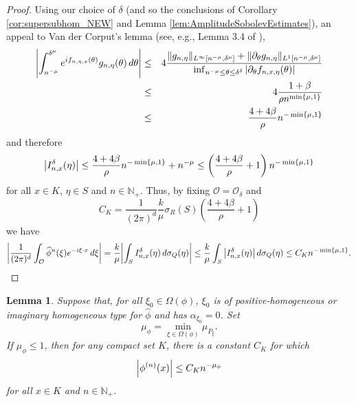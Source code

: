 \documentclass[11pt]{article}
\newtheorem{lemma}[theorem]{Lemma}
\newcommand{\f}[2]{\frac{#1}{#2}}
\begin{document}
\begin{proof}
Using our choice of $\delta$ (and so the conclusions of Corollary \ref{cor:supersubhom_NEW} and Lemma \ref{lem:AmplitudeSobolevEstimates}), an appeal to Van der Corput's lemma (see, e.g., Lemma 3.4 of \cite{Randles2015}),
\begin{eqnarray*}
    \abs{\int_{n^{-\mu}}^{\delta^\mu}e^{if_{n,\eta,x}(\theta)}g_{n,\eta}(\theta)\,d\theta}
    &\leq& 
    4
    \frac{ 
    \|g_{n,\eta}\|_{L^\infty[n^{-\mu},\delta^{\mu}]}
    +
    \|\partial_{\theta}g_{n,\eta}\|_{L^1[n^{-\mu},\delta^{\mu}]}
    }{
    \inf_{n^{-\mu}\leq\theta\leq \delta^{\delta}}|\partial_{\theta}f_{n,x,\eta}(\theta)|
    }\\
    &\leq&4\frac{1+\beta}{\rho n^{\min\{\mu,1\}}}\\
    &\leq &\frac{4+4\beta}{\rho}n^{-\min\{\mu,1\}}
\end{eqnarray*}
and therefore
\begin{equation*}
    \abs{I_{n,x}^\delta(\eta)}\leq \frac{4+4\beta}{\rho}n^{-\min\{\mu,1\}}+n^{-\mu}\leq \left(\frac{4+4\beta}{\rho}+1\right)n^{-\min\{\mu,1\}}
\end{equation*}
for all $x\in K$, $\eta\in S$ and $n\in\mathbb{N}_+$. Thus, by fixing $\mathcal{O}=\mathcal{O}_\delta$ and 
\begin{equation*}
    C_K=\f{1}{(2\pi)^d} \f{k}{\mu} \sigma_R(S)\left(\frac{4+4\beta}{\rho}+1\right)
\end{equation*}
we have
\begin{equation*}
\abs{\f{1}{(2\pi)^d}\int_{\mathcal{O}}\widehat{\phi}^n(\xi)e^{-i\xi\cdot x}\,d\xi}=\f{k}{\mu}\abs{\int_S I^\delta_{n,x}(\eta)\,d\sigma_Q(\eta)} 
\leq \f{k}{\mu}\int_S \abs{I^\delta_{n,x}(\eta)}\,d\sigma_Q(\eta) 
\leq C_K n^{-\min\{\mu,1\}}. 
\end{equation*}
\end{proof}




\begin{lemma}
Suppose that, for all $\xi_0\in \Omega(\phi)$, $\xi_0$ is of positive-homogeneous or imaginary homogeneous type for $\widehat{\phi}$ and has $\alpha_{\xi_0}=0$. Set
\begin{equation*}
    \mu_{\phi}=\min_{\xi\in\Omega(\phi)}\mu_{P_{\xi}}.
\end{equation*}
If $\mu_{\phi}\leq 1$, then for any compact set $K$, there is a constant $C_K$ for which
\begin{equation*}
    \abs{\phi^{(n)}(x)}\leq C_Kn^{-\mu_{\phi}}
\end{equation*}
for all $x\in K$ and $n\in\mathbb{N}_+$. 
\end{lemma}
\end{document}

